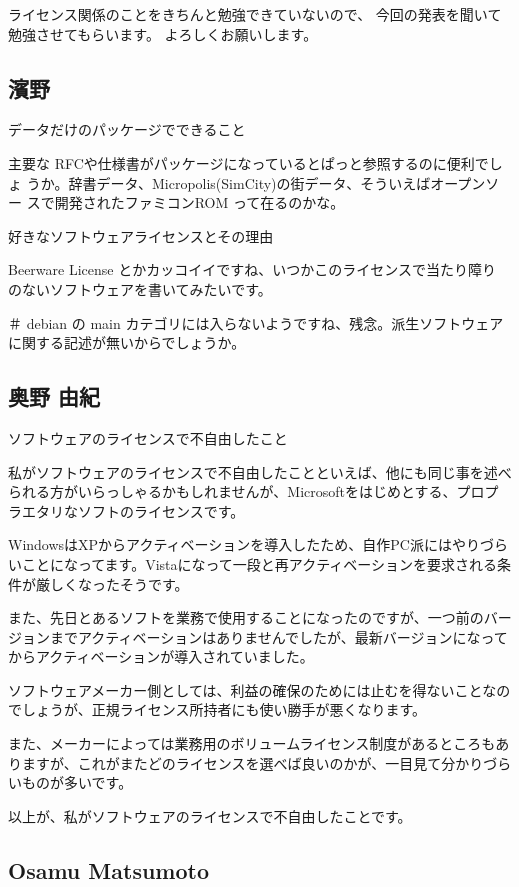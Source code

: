 \documentclass[mingoth,a4paper]{jsarticle}
\begin{document}
\begin{multicols}{2}
{ライセンス関係のことをきちんと勉強できていないので、
今回の発表を聞いて勉強させてもらいます。
よろしくお願いします。

\subsection{濱野}

データだけのパッケージでできること

主要な RFCや仕様書がパッケージになっているとぱっと参照するのに便利でしょ
うか。辞書データ、Micropolis(SimCity)の街データ、そういえばオープンソー
スで開発されたファミコンROM って在るのかな。

好きなソフトウェアライセンスとその理由

Beerware License とかカッコイイですね、いつかこのライセンスで当たり障り
のないソフトウェアを書いてみたいです。

＃ debian の main カテゴリには入らないようですね、残念。派生ソフトウェア
に関する記述が無いからでしょうか。


\subsection{奥野 由紀}

ソフトウェアのライセンスで不自由したこと

私がソフトウェアのライセンスで不自由したことといえば、他にも同じ事を述べられる方がいらっしゃるかもしれませんが、Microsoftをはじめとする、プロプラエタリなソフトのライセンスです。

WindowsはXPからアクティベーションを導入したため、自作PC派にはやりづらいことになってます。Vistaになって一段と再アクティベーションを要求される条件が厳しくなったそうです。

また、先日とあるソフトを業務で使用することになったのですが、一つ前のバージョンまでアクティベーションはありませんでしたが、最新バージョンになってからアクティベーションが導入されていました。

ソフトウェアメーカー側としては、利益の確保のためには止むを得ないことなのでしょうが、正規ライセンス所持者にも使い勝手が悪くなります。

また、メーカーによっては業務用のボリュームライセンス制度があるところもありますが、これがまたどのライセンスを選べば良いのかが、一目見て分かりづらいものが多いです。

以上が、私がソフトウェアのライセンスで不自由したことです。

\subsection{Osamu Matsumoto}

}
\end{multicols}
\end{document}
